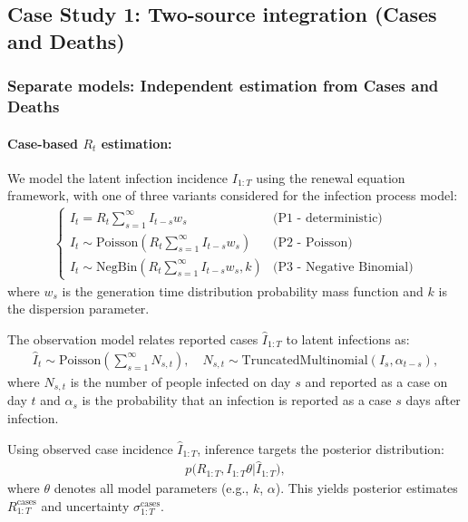 \documentclass{article}
\begin{document}
\subsection{Case Study 1: Two-source integration (Cases and Deaths)}

\subsubsection{Separate models: Independent estimation from Cases and Deaths}

\paragraph{Case-based $R_{t}$ estimation:}
We model the latent infection incidence $I_{1:T}$ using the renewal equation framework, with one of three variants considered for the infection process model:
\begin{align}
\label{latent_inf}
\begin{cases}
I_t = R_t \sum_{s=1}^\infty I_{t-s} w_s & \text{(P1 - deterministic)} \\
I_t \sim \mathrm{Poisson}\left( R_t \sum_{s=1}^\infty I_{t-s} w_s \right) & \text{(P2 - Poisson)} \\
I_t \sim \mathrm{NegBin}\left( R_t \sum_{s=1}^\infty I_{t-s} w_s, k \right) & \text{(P3 - Negative Binomial)}
\end{cases}
\end{align}
where $w_s$ is the generation time distribution probability mass function and $k$ is the dispersion parameter.

The observation model relates reported cases $\widehat{I}_{1:T}$ to latent infections as:
\begin{align}
\widehat{I}_t \sim \mathrm{Poisson}\left( \sum_{s=1}^\infty N_{s,t} \right), \quad N_{s,t} \sim \mathrm{TruncatedMultinomial}(I_s, \alpha_{t-s}),
\end{align}
where $N_{s,t}$ is the number of people infected on day $s$ and reported as a case on day $t$ and $\alpha_s$ is the probability that an infection is reported as a case $s$ days after infection. 

Using observed case incidence $\widehat{I}_{1:T}$, inference targets the posterior distribution:
\begin{align}
p\big(R_{1:T}, I_{1:T} \theta | \widehat{I}_{1:T}\big),
\end{align}
where $\theta$ denotes all model parameters (e.g., $k$, $\alpha$). This yields posterior estimates $R_{1:T}^\text{cases}$ and uncertainty $\sigma_{1:T}^\text{cases}$.
\end{document}

